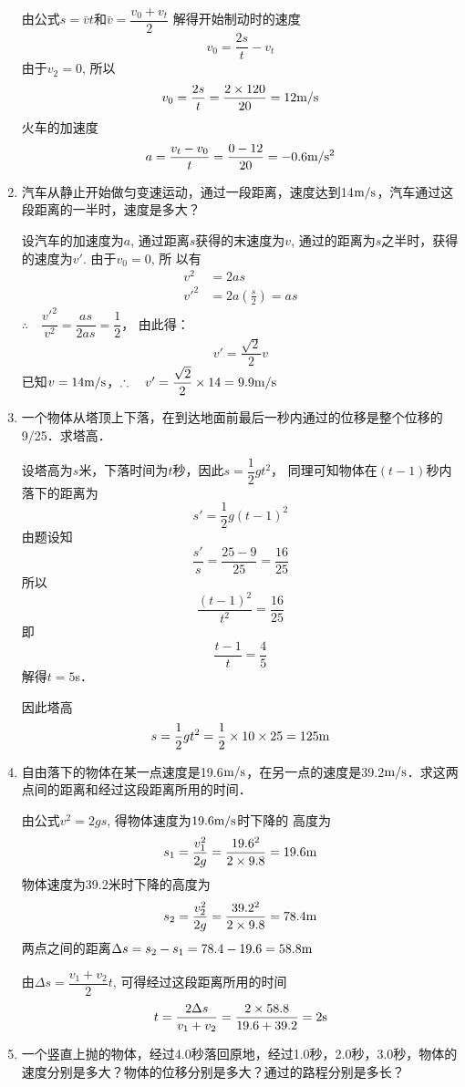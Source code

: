 \begin{enumerate}
    \begin{solution}
由公式$s=\bar v t$和$\bar v=\dfrac{v_0+v_t}{2}$
解得开始制动时的速度
\[v_0=\frac{2s}{t}-v_t\]
由于$v_2=0$, 所以
\[v_0=\frac{2s}{t}=\frac{2\times 120}{20}=12\text{m}/\text{s}\]
火车的加速度
\[a=\frac{v_t-v_0}{t}=\frac{0-12}{20}=-0.6\text{m}/\text{s}^2\]        
    \end{solution}
	\item 汽车从静止开始做匀变速运动，通过一段距离，速度达到14$\text{m}/\text{s}$，汽车通过这段距离的一半时，速度是多大？

    \begin{solution}
        设汽车的加速度为$a$, 通过距离$s$获得的末速度为$v$, 通过的距离为$s$之半时，获得的速度为$v'$. 由于$v_0=0$, 所
        以有
\[\begin{split}
    v^2&=2as\\
    {v'}^2&=2a\left(\frac{s}{2}\right)=as
\end{split}\]
$\therefore\quad \dfrac{ {v'}^2}{v^2}=\dfrac{as}{2as}=\dfrac{1}{2}$，
由此得：
\[v'=\frac{\sqrt{2}}{2}v\]
已知$v=14\text{m}/\text{s}$，$\therefore\quad v'=\dfrac{\sqrt{2}}{2}\times 14=9.9\text{m}/\text{s}$
\end{solution}
	\item 一个物体从塔顶上下落，在到达地面前最后一秒内通过的位移是整个位移的9/25．求塔高．

    \begin{solution}
设塔高为$s$米，下落时间为$t$秒，因此$s=\dfrac{1}{2}gt^2$，
同理可知物体在$(t-1)$秒内落下的距离为
\[s'=\frac{1}{2}g(t-1)^2\]
由题设知
\[\frac{s'}{s}=\frac{25-9}{25}=\frac{16}{25}\]
所以
\[\frac{(t-1)^2}{t^2}=\frac{16}{25}\]
即\[\frac{t-1}{t}=\frac{4}{5}\]
解得$t=5$s．

因此塔高
\[s=\frac{1}{2}gt^2=\frac{1}{2}\times10\times25=125{\rm m}\]
    \end{solution}
	\item 自由落下的物体在某一点速度是19.6$\text{m}/\text{s}$，在另一点的速度是39.2$\text{m}/\text{s}$．求这两点间的距离和经过这段距离所用的时间．

    \begin{solution}
由公式$v^2=2gs$, 得物体速度为$19.6\text{m}/\text{s}$时下降的
高度为
\[s_1=\frac{v^2_1}{2g}=\frac{19.6^2}{2\times 9.8}=19.6{\rm m}\]
物体速度为39.2米时下降的高度为
\[s_2=\frac{v^2_2}{2g}=\frac{39.2^2}{2\times 9.8}=78.4{\rm m}\]
两点之间的距离$\Delta s=s_2-s_1=78.4-19.6=58.8{\rm m}$

由$\Delta s=\dfrac{v_1+v_2}{2}t$, 可得经过这段距离所用的时间
\[t=\frac{2\Delta s}{v_1+v_2}=\frac{2\times 58.8}{19.6+39.2}=2{\rm s}\]
    \end{solution}
	\item 一个竖直上抛的物体，经过4.0秒落回原地，经过1.0秒，2.0秒，3.0秒，物体的速度分别是多大？物体的位移分别是多大？通过的路程分别是多长？


\end{enumerate}
